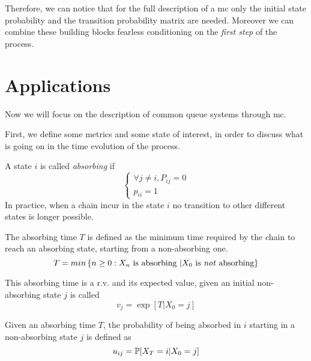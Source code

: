 \bigbreak
Therefore, we can notice that for the full description of a \gls{mc} only the initial state probability and the transition probability matrix are needed.
Moreover we can combine these building blocks fearless conditioning on the \emph{first step} of the process.

\section{Applications}
Now we will focus on the description of common queue systems through \gls{mc}.

First, we define some metrics and some state of interest, in order to discuss what is going on in the time evolution of the process.

\begin{definition}
	A state $i$ is called \emph{absorbing} if
	\begin{equation*}
		\begin{cases}
			\forall j\neq i, P_{ij}=0 \\
			p_{ii}=1
		\end{cases}
	\end{equation*}
	In practice, when a chain incur in the state $i$ no transition to other different states is longer possible.
\end{definition}

\begin{definition}
	The absorbing time $T$ is defined as the minimum time required by the chain to reach an absorbing state, starting from a non-absorbing one.
	\begin{equation*}
		T = min \left\{ n \ge 0 : X_n \text{ is absorbing } | X_0 \text{ is \emph{not} absorbing} \right\}
	\end{equation*}

	This absorbing time is a r.v. and its expected value, given an initial non-absorbing state $j$ is called
	\begin{equation*}
		v_j = \exp[T | X_0 = j]
	\end{equation*}
\end{definition}

\begin{definition}
	Given an absorbing time $T$, the probability of being absorbed in $i$ starting in a non-absorbing state $j$ is defined as
	\begin{equation*}
		u_{ij} = \mathbb{P}[X_T = i | X_0 = j]
	\end{equation*}
\end{definition}

